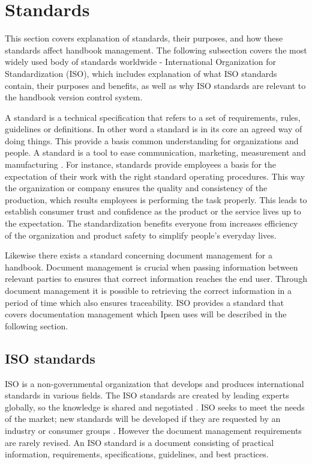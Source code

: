 \section{Standards}
This section covers explanation of standards, their purposes, and how these standards affect handbook management. The following subsection covers the most widely used body of standards worldwide - International Organization for Standardization (ISO)\cite{ISOworldwidemostused}, which includes explanation of what ISO standards contain, their purposes and benefits, as well as why ISO standards are relevant to the handbook version control system.

A standard is a technical specification that refers to a set of requirements, rules, guidelines or definitions\citep[p.~5]{Standard}. In other word a standard is in its core an agreed way of doing things. This provide a basis common understanding for organizations and people. A standard is a tool to ease communication, marketing, measurement and manufacturing \cite{Standardtool}. For instance, standards provide employees a basis for the expectation of their work with the right standard operating procedures. This way the organization or company ensures the quality and consistency of the production, which results employees is performing the task properly.
This leads to establish consumer trust and confidence as the product or the service lives up to the expectation. The standardization benefits everyone from increases efficiency of the organization and product safety to simplify people's everyday lives\citep[p.~83]{Standardization}.

Likewise there exists a standard concerning document management for a handbook. Document management is crucial when passing information between relevant parties to ensures that correct information reaches the end user. Through document management it is possible to retrieving the correct information in a period of time which also ensures traceability. ISO provides a standard that covers documentation management which Ipsen uses will be described in the following section.

\subsection{ISO standards}
ISO is a non-governmental organization that develops and produces international standards in various fields. The ISO standards are created by leading experts globally, so the knowledge is shared and negotiated \cite{ISOinfo}. ISO seeks to meet the needs of the market; new standards will be developed if they are requested by an industry or consumer groups \cite{ISOdeveloping}. However the document management requirements are rarely revised\cite{Ipsenfirstinterview}. An ISO standard is a document consisting of practical information, requirements, specifications, guidelines, and best practices.\cite{ISOreviewedevery5years}

